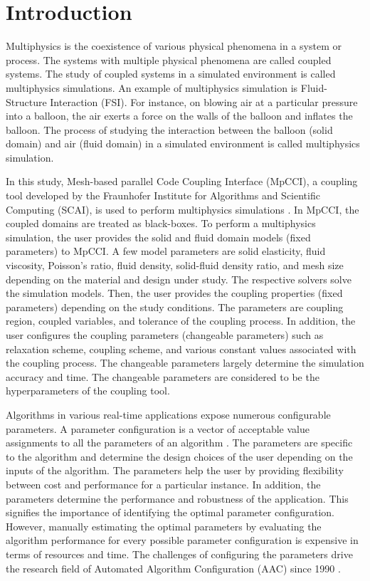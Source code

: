 
\chapter{Introduction}
\label{section:introduction}
Multiphysics is the coexistence of various physical phenomena in a system or process. The systems with multiple physical phenomena are called coupled systems. The study of coupled systems in a simulated environment is called multiphysics simulations. An example of multiphysics simulation is Fluid-Structure Interaction (FSI). For instance, on blowing air at a particular pressure into a balloon, the air exerts a force on the walls of the balloon and inflates the balloon. The process of studying the interaction between the balloon (solid domain) and air (fluid domain) in a simulated environment is called multiphysics simulation.

In this study, Mesh-based parallel Code Coupling Interface (MpCCI), a coupling tool developed by the Fraunhofer Institute for Algorithms and Scientific Computing (SCAI), is used to perform multiphysics simulations \cite{MpCCI_documentation}. In MpCCI, the coupled domains are treated as black-boxes. To perform a multiphysics simulation, the user provides the solid and fluid domain models (fixed parameters) to MpCCI. A few model parameters are solid elasticity, fluid viscosity, Poisson's ratio, fluid density, solid-fluid density ratio, and mesh size depending on the material and design under study. The respective solvers solve the simulation models. Then, the user provides the coupling properties (fixed parameters) depending on the study conditions. The parameters are coupling region, coupled variables, and tolerance of the coupling process. In addition, the user configures the coupling parameters (changeable parameters) such as relaxation scheme, coupling scheme, and various constant values associated with the coupling process. The changeable parameters largely determine the simulation accuracy and time. The changeable parameters are considered to be the hyperparameters of the coupling tool.

Algorithms in various real-time applications expose numerous configurable parameters. A parameter configuration is a vector of acceptable value assignments to all the parameters of an algorithm \cite{Hutterphd}. The parameters are specific to the algorithm and determine the design choices of the user depending on the inputs of the algorithm. The parameters help the user by providing flexibility between cost and performance for a particular instance. In addition, the parameters determine the performance and robustness of the application. This signifies the importance of identifying the optimal parameter configuration. However, manually estimating the optimal parameters by evaluating the algorithm performance for every possible parameter configuration is expensive in terms of resources and time. The challenges of configuring the parameters drive the research field of Automated Algorithm Configuration (AAC) since 1990 \cite{AACfirstwork} \cite{Gratch_1992}.

